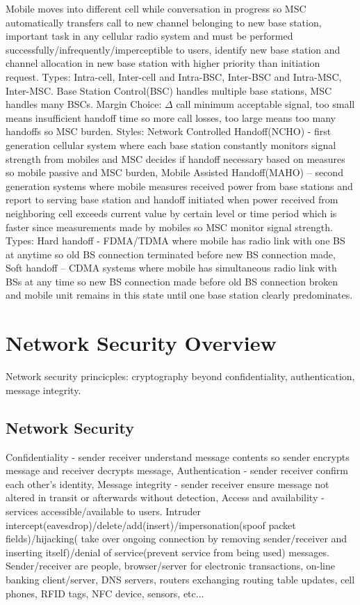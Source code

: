 \documentclass[9pt]{extarticle}
\begin{document}
\begin{multicols}{2}
Mobile moves into different cell while conversation in progress so MSC automatically transfers call to new channel belonging to new base station, important task in any cellular radio system and must be performed successfully/infrequently/imperceptible to users, identify new base station and channel allocation in new base station with higher priority than initiation request. Types: Intra-cell, Inter-cell and Intra-BSC, Inter-BSC and Intra-MSC, Inter-MSC. Base Station Control(BSC) handles multiple base stations, MSC handles many BSCs.  Margin Choice: $\Delta$ call minimum acceptable signal, too small means insufficient handoff time so more call losses, too large means too many handoffs so MSC burden. Styles: Network Controlled Handoff(NCHO) - first generation cellular system where each base station constantly monitors signal strength from mobiles and MSC decides if handoff necessary based on measures so mobile passive and MSC burden, Mobile Assisted Handoff(MAHO) – second generation systems where mobile measures received power from  base stations and report to serving base station and handoff initiated when power received from neighboring cell exceeds current value by certain level or time period which is faster since measurements made by mobiles so MSC monitor signal strength. Types: Hard handoff - FDMA/TDMA where mobile has radio link with one BS at anytime so old BS connection terminated before new BS connection made, Soft handoff – CDMA systems where mobile has simultaneous radio link with BSs at any time so new BS connection made before old BS connection broken and mobile unit remains in this state until one base station clearly predominates.

\section{Network Security Overview}

Network security princicples: cryptography beyond confidentiality, authentication, message integrity.

\subsection{Network Security}

Confidentiality - sender receiver understand message contents so sender encrypts message and receiver decrypts message, Authentication - sender receiver confirm each other's identity, Message integrity - sender receiver ensure message not altered in transit or afterwards without detection, Access and availability - services accessible/available to users. Intruder intercept(eavesdrop)/delete/add(insert)/impersonation(spoof packet fields)/hijacking( take over ongoing connection by removing sender/receiver and inserting itself)/denial of service(prevent service from being used) messages. Sender/receiver are people, browser/server for electronic transactions, on-line banking client/server, DNS servers, routers exchanging routing table updates, cell phones, RFID tags, NFC device, sensors, etc...


\end{multicols}
\end{document}
